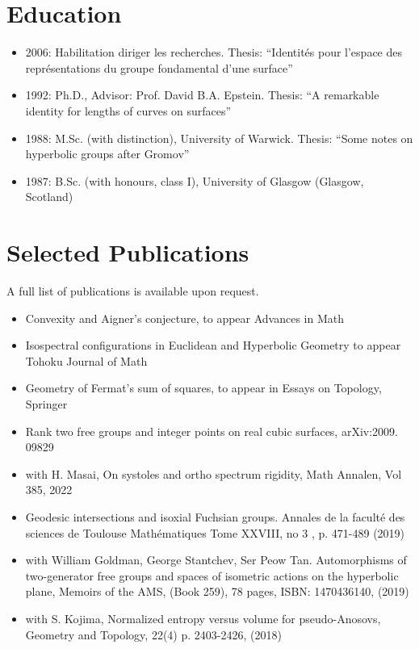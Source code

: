 \documentclass[11pt,a4paper]{article}
\begin{document}
\section*{Education}
\begin{itemize}
    \item 2006: Habilitation diriger les recherches. Thesis: ``Identités pour l’espace des représentations du groupe fondamental d’une surface''
    \item 1992: Ph.D., Advisor: Prof. David B.A. Epstein. Thesis: ``A remarkable identity for lengths of curves on surfaces''
    \item 1988: M.Sc. (with distinction), University of Warwick. Thesis: ``Some notes on hyperbolic groups after Gromov''
    \item 1987: B.Sc. (with honours, class I), University of Glasgow (Glasgow, Scotland)
\end{itemize}

\section*{Selected Publications}
A full list of publications is available upon request.

\begin{itemize}

	\item Convexity and Aigner’s conjecture, to appear Advances in Math
	\item Isospectral configurations in Euclidean and Hyperbolic Geometry to appear Tohoku Journal of Math
	\item Geometry of Fermat’s sum of squares, to appear in Essays on Topology, Springer
	\item Rank two free groups and integer points on real  cubic surfaces,   arXiv:2009. 09829
	\item with H. Masai,  On systoles and ortho spectrum rigidity, Math Annalen, Vol 385, 2022  
	\item Geodesic intersections and isoxial Fuchsian groups. Annales de la faculté des sciences de Toulouse Mathématiques  Tome XXVIII, no 3 , p. 471-489 (2019)
	\item with William Goldman,  George Stantchev, Ser Peow Tan. Automorphisms of two-generator free groups and spaces of isometric actions on the hyperbolic plane,
	Memoirs of the AMS, (Book 259), 78 pages,  ISBN: 1470436140, (2019)
	\item with S. Kojima, Normalized entropy versus volume for pseudo-Anosovs, Geometry and Topology, 22(4) p. 2403-2426,    (2018)
\end{itemize}
\end{document}
